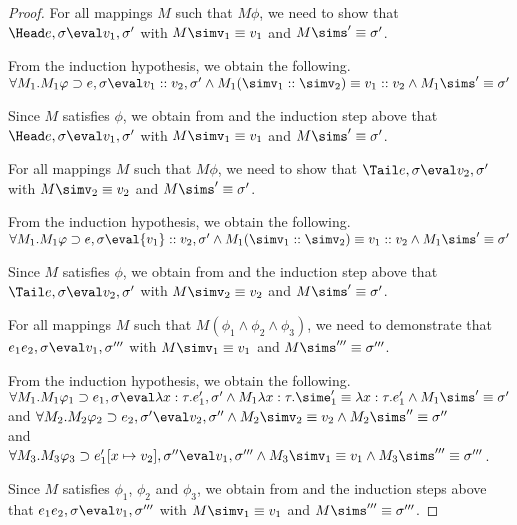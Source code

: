 \begin{proof}
  {For all mappings $M$ such that $M\phi$, we need to show that
  $\Head e,\sigma\eval v_1,\sigma'$ with
  $M \simv_1\equiv {v_1}$ and $M\sims'\equiv{\sigma'}$.

  From the induction hypothesis, we obtain the following.\\
  $\forall M_1 . M_1\phi \implies e, \sigma\eval v_1 :: v_2 , \sigma' \land M_1 (\simv_1::\simv_2)\equiv {v_1}::{v_2}\land M_1\sims'\equiv{\sigma'}$

  Since $M$ satisfies $\phi$,
  we obtain from  and the induction step above that $\Head e,\sigma{\eval}{v_1},\sigma'$ with
  $M \simv_1\equiv {v_1}$ and $M\sims'\equiv\sigma'$.}

  { For all mappings $M$ such that $M\phi$, we need to show that
    $\Tail e,\sigma\eval v_2,\sigma'$ with
    $M \simv_2\equiv{v_2}$ and $M\sims'\equiv{\sigma'}$.

    From the induction hypothesis, we obtain the following.\\
    $\forall M_1 . M_1\phi \implies e, \sigma\eval {v_1}::{v_2},{\sigma'}\land M_1(\simv_1::\simv_2)\equiv {v_1}::{v_2}\land M_1\sims'\equiv{\sigma'}$

    Since $M$ satisfies $\phi$,
    we obtain from  and the induction step above that $\Tail e,\sigma{\eval}{v_2},\sigma'$ with
    $M \simv_2\equiv {v_2}$ and $M\sims'\equiv{\sigma'}$.}

  {For all mappings $M$ such that $M(\phi_1 \land \phi_2\land \phi_3)$, we need to demonstrate that
  $e_1e_2,\sigma\eval v_1,\sigma'''$ with
   $M \simv_1 \equiv {v_1}$ and $M\sims'''\equiv{\sigma'''}$.

  From the induction hypothesis, we obtain the following.\\
  $\forall M_1 . M_1\phi_1 \implies e_1,\sigma{\eval}\lambda x : \tau.{e_1'},{\sigma'}
  \land M_1\lambda x : \tau.\sime_1' \equiv \lambda x : \tau.{e_1'} \land M_1\sims'\equiv{\sigma'}$\\
  and
  $\forall M_2 . M_2\phi_2 \implies e_2,\sigma'{\eval}{v_2},{\sigma''}
  \land M_2 \simv_2 \equiv {v_2} \land M_2\sims'' \equiv{\sigma''}$\\
  and
  $\forall M_3 . M_3\phi_3 \implies e_1'[x\mapsto {v_2}],\sigma''{\eval}{v_1},{\sigma'''}
  \land M_3 \simv_1\equiv {v_1} \land M_3 \sims'''\equiv{\sigma'''}$.

  Since $M$ satisfies $\phi_1$, $\phi_2$ and $\phi_3$, we obtain from  and the induction steps above that $e_1e_2,\sigma\eval v_1,\sigma'''$ with $M \simv_1 \equiv {v_1}$ and $M\sims'''\equiv{\sigma'''}$.
  }


\end{proof}
